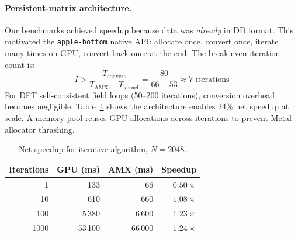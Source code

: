 \documentclass[conference]{IEEEtran}
\newcommand{\AB}{\texttt{apple-bottom}}
\begin{document}
\paragraph{Persistent-matrix architecture.} Our benchmarks achieved speedup because data was \emph{already} in DD format. This motivated the \AB{} native API: allocate once, convert once, iterate many times on GPU, convert back once at the end.
The break-even iteration count is:
\begin{equation}
I > \frac{T_{\text{convert}}}{T_{\text{AMX}} - T_{\text{kernel}}} = \frac{80}{66 - 53} \approx 7 \text{ iterations}
\end{equation}
For DFT self-consistent field loops (50--200 iterations), conversion overhead becomes negligible. Table~\ref{tab:iter} shows the architecture enables 24\% net speedup at scale. A memory pool reuses GPU allocations across iterations to prevent Metal allocator thrashing.
\begin{table}[t]
\centering
\caption{Net speedup for iterative algorithm, $N{=}2048$.}
\label{tab:iter}
\begin{tabular}{r@{\hskip 10pt}r@{\hskip 10pt}r@{\hskip 10pt}r}
\toprule
\textbf{Iterations} & \textbf{GPU (ms)} & \textbf{AMX (ms)} & \textbf{Speedup} \\
\midrule
1    & 133   & 66    & $0.50\times$ \\
10   & 610   & 660   & $1.08\times$ \\
100  & 5\,380  & 6\,600  & $1.23\times$ \\
1000 & 53\,100 & 66\,000 & $\mathbf{1.24\times}$ \\
\bottomrule
\end{tabular}
\end{table}
\end{document}
